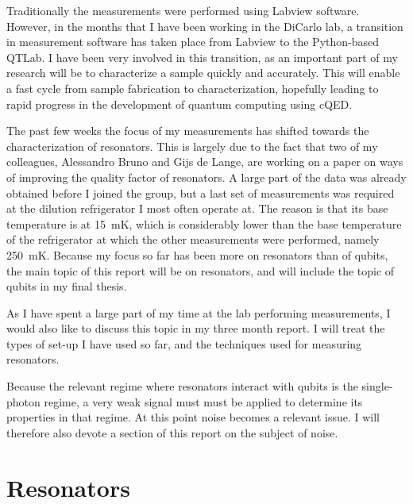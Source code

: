 \documentclass[12pt]{report}
\begin{document}
Traditionally the measurements were performed using Labview software. However, in the months that I have been working in the DiCarlo lab, a transition in measurement software has taken place from Labview to the Python-based QTLab. I have been very involved in this transition, as an important part of my research will be to characterize a sample quickly and accurately. This will enable a fast cycle from sample fabrication to characterization, hopefully leading to rapid progress in the development of quantum computing using cQED.

The past few weeks the focus of my measurements has shifted towards the characterization of resonators. This is largely due to the fact that two of my colleagues, Alessandro Bruno and Gijs de Lange, are working on a paper on ways of improving the quality factor of resonators. A large part of the data was already obtained before I joined the group, but a last set of measurements was required at the dilution refrigerator I most often operate at. The reason is that its base temperature is at \SI{15}{\milli \kelvin}, which is considerably lower than the base temperature of the refrigerator at which the other measurements were performed, namely \SI{250}{\milli \kelvin}. Because my focus so far has been more on resonators than of qubits, the main topic of this report will be on resonators, and will include the topic of qubits in my final thesis.

As I have spent a large part of my time at the lab performing measurements, I would also like to discuss this topic in my three month report. I will treat the types of set-up I have used so far, and the techniques used for measuring resonators.

Because the relevant regime where resonators interact with qubits is the single-photon regime, a very weak signal must must be applied to determine its properties in that regime. At this point noise becomes a relevant issue. I will therefore also devote a section of this report on the subject of noise.

\newpage














\chapter{Resonators}
\end{document}
